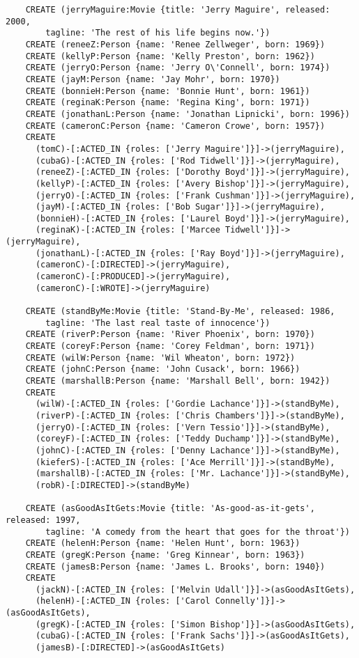 \begin{lstlisting}
	CREATE (jerryMaguire:Movie {title: 'Jerry Maguire', released: 2000,
	    tagline: 'The rest of his life begins now.'})
	CREATE (reneeZ:Person {name: 'Renee Zellweger', born: 1969})
	CREATE (kellyP:Person {name: 'Kelly Preston', born: 1962})
	CREATE (jerryO:Person {name: 'Jerry O\'Connell', born: 1974})
	CREATE (jayM:Person {name: 'Jay Mohr', born: 1970})
	CREATE (bonnieH:Person {name: 'Bonnie Hunt', born: 1961})
	CREATE (reginaK:Person {name: 'Regina King', born: 1971})
	CREATE (jonathanL:Person {name: 'Jonathan Lipnicki', born: 1996})
	CREATE (cameronC:Person {name: 'Cameron Crowe', born: 1957})
	CREATE
	  (tomC)-[:ACTED_IN {roles: ['Jerry Maguire']}]->(jerryMaguire),
	  (cubaG)-[:ACTED_IN {roles: ['Rod Tidwell']}]->(jerryMaguire),
	  (reneeZ)-[:ACTED_IN {roles: ['Dorothy Boyd']}]->(jerryMaguire),
	  (kellyP)-[:ACTED_IN {roles: ['Avery Bishop']}]->(jerryMaguire),
	  (jerryO)-[:ACTED_IN {roles: ['Frank Cushman']}]->(jerryMaguire),
	  (jayM)-[:ACTED_IN {roles: ['Bob Sugar']}]->(jerryMaguire),
	  (bonnieH)-[:ACTED_IN {roles: ['Laurel Boyd']}]->(jerryMaguire),
	  (reginaK)-[:ACTED_IN {roles: ['Marcee Tidwell']}]->(jerryMaguire),
	  (jonathanL)-[:ACTED_IN {roles: ['Ray Boyd']}]->(jerryMaguire),
	  (cameronC)-[:DIRECTED]->(jerryMaguire),
	  (cameronC)-[:PRODUCED]->(jerryMaguire),
	  (cameronC)-[:WROTE]->(jerryMaguire)
	
	CREATE (standByMe:Movie {title: 'Stand-By-Me', released: 1986,
	    tagline: 'The last real taste of innocence'})
	CREATE (riverP:Person {name: 'River Phoenix', born: 1970})
	CREATE (coreyF:Person {name: 'Corey Feldman', born: 1971})
	CREATE (wilW:Person {name: 'Wil Wheaton', born: 1972})
	CREATE (johnC:Person {name: 'John Cusack', born: 1966})
	CREATE (marshallB:Person {name: 'Marshall Bell', born: 1942})
	CREATE
	  (wilW)-[:ACTED_IN {roles: ['Gordie Lachance']}]->(standByMe),
	  (riverP)-[:ACTED_IN {roles: ['Chris Chambers']}]->(standByMe),
	  (jerryO)-[:ACTED_IN {roles: ['Vern Tessio']}]->(standByMe),
	  (coreyF)-[:ACTED_IN {roles: ['Teddy Duchamp']}]->(standByMe),
	  (johnC)-[:ACTED_IN {roles: ['Denny Lachance']}]->(standByMe),
	  (kieferS)-[:ACTED_IN {roles: ['Ace Merrill']}]->(standByMe),
	  (marshallB)-[:ACTED_IN {roles: ['Mr. Lachance']}]->(standByMe),
	  (robR)-[:DIRECTED]->(standByMe)
	
	CREATE (asGoodAsItGets:Movie {title: 'As-good-as-it-gets', released: 1997,
	    tagline: 'A comedy from the heart that goes for the throat'})
	CREATE (helenH:Person {name: 'Helen Hunt', born: 1963})
	CREATE (gregK:Person {name: 'Greg Kinnear', born: 1963})
	CREATE (jamesB:Person {name: 'James L. Brooks', born: 1940})
	CREATE
	  (jackN)-[:ACTED_IN {roles: ['Melvin Udall']}]->(asGoodAsItGets),
	  (helenH)-[:ACTED_IN {roles: ['Carol Connelly']}]->(asGoodAsItGets),
	  (gregK)-[:ACTED_IN {roles: ['Simon Bishop']}]->(asGoodAsItGets),
	  (cubaG)-[:ACTED_IN {roles: ['Frank Sachs']}]->(asGoodAsItGets),
	  (jamesB)-[:DIRECTED]->(asGoodAsItGets)
	

\end{lstlisting}
